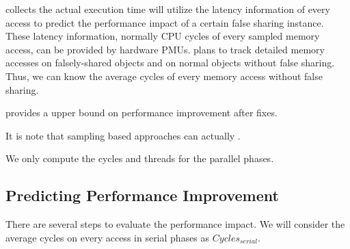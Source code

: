\cheetah{} collects the actual execution time 
\cheetah{} will utilize the latency information of every access to predict the performance impact of a certain false sharing instance. These latency information, normally CPU cycles of every sampled memory access, can be provided by hardware PMUs. \Cheetah{} plans to track detailed memory accesses on falsely-shared objects and on normal objects without false sharing. Thus, we can know the average cycles of every memory access without false sharing. 

\cheetah{} provides a upper bound on performance improvement after fixes. 

It is note that sampling based approaches can actually 
.

We only compute the cycles and threads for the parallel phases. 

\subsection{Predicting Performance Improvement}

There are several steps to evaluate the performance impact. We will consider the average cycles on every access in serial phases as $Cycles_{serial}$. 
















